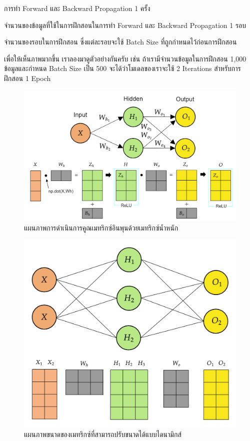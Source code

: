 \begin{description}[font=$\bullet$~\normalfont\scshape\bfseries\color{red!50!black}]
    \item[1 Epoch] การทำ Forward และ Backward Propagation 1 ครั้ง
    
    \item[Batch Size] จำนวนของข้อมูลที่ใช้ในการฝึกสอนในการทำ Forward และ Backward Propagation 1 รอบ
    
    \item[Iteration] จำนวนของรอบในการฝึกสอน ซึ่งแต่ละรอบจะใช้ Batch Size ที่ถูกกำหนดไว้ก่อนการฝึกสอน
\end{description}

เพื่อให้เห็นภาพมากขึ้น เราลองมาดูตัวอย่างกันครับ เช่น ถ้าเรามีจำนวนข้อมูลในการฝึกสอน 1,000 ข้อมูลและกำหนด Batch Size เป็น 500 
จะได้ว่าโมเดลของเราจะใช้ 2 Iterations สำหรับการฝึกสอน 1 Epoch

\begin{figure}[htbp]
    \centering
    \includegraphics[width=0.9\linewidth]{fig/nn_feedforward_matrices.png}
    \caption{แผนภาพการดำเนินการคูณเมทริกซ์อินพุนด้วยเมทริกซ์น้ำหนัก}
    \label{fig:nn_ff_mat}
\end{figure}

\begin{figure}[htbp]
    \centering
    \includegraphics[width=0.8\linewidth]{fig/nn_feedforward_dyn_resizing.png}
    \caption{แผนภาพขนาดของเมทริกซ์ที่สามารถปรับขนาดได้แบบไดนามิกส์}
    \label{fig:nn_ff_dyn_resize}
\end{figure}

